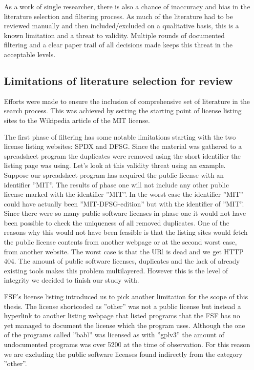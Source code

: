 As a work of single researcher, there is also a chance of inaccuracy and bias in the literature selection and filtering process. As much of the literature had to be reviewed manually and then included/excluded on a qualitative basis, this is a known limitation and a threat to validity. Multiple rounds of documented filtering and a clear paper trail of all decisions made keeps this threat in the acceptable levels.

\subsection{Limitations of literature selection for review}
Efforts were made to ensure the inclusion of comprehensive set of literature in the search process. This was achieved by setting the starting point of license listing sites to the Wikipedia article of the MIT license.

The first phase of filtering has some notable limitations starting with the two license listing websites: SPDX and DFSG. Since the material was gathered to a spreadsheet program the duplicates were removed using the short identifier the listing page was using. Let's look at this validity threat using an example. Suppose our spreadsheet program has acquired the public license with an identifier ''MIT''. The results of phase one will not include any other public license marked with the identifier ''MIT''. In the worst case the identifier ''MIT'' could have actually been ''MIT-DFSG-edition'' but with the identifier of ''MIT''. Since there were so many public software licenses in phase one it would not have been possible to check the uniqueness of all removed duplicates. One of the reasons why this would not have been feasible is that the listing sites would fetch the public license contents from another webpage or at the second worst case, from another website. The worst case is that the URl is dead and we get HTTP 404. The amount of public software licenses, duplicates and the lack of already existing tools makes this problem multilayered. However this is the level of integrity we decided to finish our study with.

FSF's license listing introduced us to pick another limitation for the scope of this thesis. The license shortcoded as ''other'' was not a public license but instead a hyperlink to another listing webpage that listed programs that the FSF has no yet managed to document the license which the program uses. Although the one of the programs called ''babl'' was licensed as with ''gplv3'' the amount of undocumented programs was over 5200 at the time of observation. For this reason we are excluding the public software licenses found indirectly from the category ''other''.

